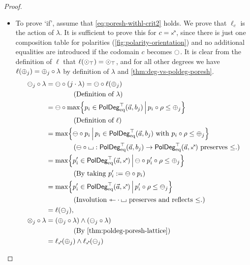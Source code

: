 \documentclass[a4paper]{memoir}
\begin{document}
\begin{proof}
\begin{enumerate}
\begin{itemize}
			\item To prove `if', assume that \cref{eq:poresh-withl-crit2} holds. We prove that $\ell_c$ is the action of $\lambda$.
			It is sufficient to prove this for $c = \ypolar$, since there is just one composition table for polarities (\cref{fig:polarity-orientation}) and no additional equalities are introduced if the codomain $c$ becomes $\npolar$.
			It is clear from the definition of $\ell$ that $\ell({\odot}_\top) = {\odot}_\top$, and for all other degrees we have $\ell({\oplus}_j) = {\oplus}_j \circ \lambda$ by definition of $\lambda$ and \cref{thm:deg-vs-poldeg-poresh}.
			\begin{align*}
				\negpol_j \circ \lambda
				&= \negpol \circ (j \cdot \lambda)
				= \negpol \circ \ell(\pospol_j) \\
				& \qquad \qquad \text{(Definition of $\lambda$)} \\
				&= \negpol \circ \max \set{p_i \in \poldegeqtop(\vec a, b_j)}{p_i \circ \rho \leq \pospol_j} \\
				& \qquad \qquad \text{(Definition of $\ell$)} \\
				&= \max \set{\negpol \circ p_i}{p_i \in \poldegeqtop(\vec a, b_j) \text{ with } p_i \circ \rho \leq \pospol_j} \\
				& \qquad \qquad \text{($\negpol \circ \loch : \poldegeqtop(\vec a, b_j) \to \poldegeqtop(\vec a, \ypolar)$ preserves $\leq$.)} \\
				&= \max \set{p'_i \in \poldegeqtop(\vec a, \ypolar)}{\negpol \circ p'_i \circ \rho \leq \pospol_j} \\
				& \qquad \qquad \text{(By taking $p'_i := \negpol \circ p_i$)} \\
				&= \max \set{p'_i \in \poldegeqtop(\vec a, \ypolar)}{p'_i \circ \rho \leq \negpol_j} \\
				& \qquad \qquad \text{(Involution $\tejsym \cdot \loch$ preserves and reflects $\leq$.)} \\
				&= \ell(\negpol_j), \\
				\mixpol_j \circ \lambda
				&= (\pospol_j \circ \lambda) \wedge (\negpol_j \circ \lambda) \\
				& \qquad \qquad \text{(By \cref{thm:poldeg-poresh-lattice})} \\
				&= \ell_\ypolar(\pospol_j) \wedge \ell_\ypolar(\negpol_j) \\

\end{align*}
\end{itemize}
\end{enumerate}
\end{proof}
\end{document}
